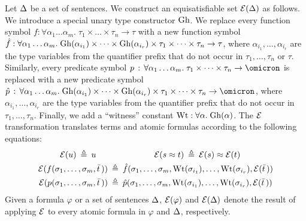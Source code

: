 
Let $\mathrm{\Delta}$ be a set of sentences.
We construct an equisatisfiable set $\mathcal{E}(\mathrm{\Delta})$ as follows.
%
We introduce a special unary type constructor $\mathrm{Gh}$.
We replace every function symbol $f : \forall \alpha_1\dots\alpha_m .\; \tau_1 \times \dots \times \tau_n \to \tau$
with a new function symbol $\hat{f} : \forall \alpha_1\dots\alpha_m .\;
\mathrm{Gh}(\alpha_{i_1}) \times \dots \times \mathrm{Gh}(\alpha_{i_r}) \times
\tau_1 \times \dots \times \tau_n \to \tau$,
where $\alpha_{i_1},\dots,\alpha_{i_r}$ are the type
variables from the quantifier prefix that do not occur in
$\tau_1,\dots,\tau_n$ or $\tau$.
Similarly, every predicate symbol $p \,\ty\,
\forall \alpha_1\dots\alpha_m .\;\allowbreak \tau_1 \times \dots \times \tau_n \to \omicron$
is replaced with a new predicate symbol $\hat{p} \,\ty\,
\forall \alpha_1\dots\alpha_m .\;\allowbreak
\ghost(\alpha_{i_1}) \times \dots \times \ghost(\alpha_{i_r}) \times
\tau_1 \times \dots \times \tau_n \to \omicron$,
where $\alpha_{i_1},\dots,\alpha_{i_r}$ are the type
variables from the quantifier prefix that do not occur in
$\tau_1,\dots,\tau_n$.
Finally, we add a ``witness'' constant $\mathrm{Wt} : \forall \alpha.\;\mathrm{Gh}(\alpha)$.
The $\mathcal{E}$ transformation translates terms and atomic
formulas according to the following equations:
\begin{align*}
\ELI(u) \eqdef u
\kern1.4em & \kern5.55em %
\ELI(s \eq t) \eqdef \ELI(s) \eq \ELI(t) \\
\ELI(f(\sigma_1,\dots,\sigma_m,\bar t\,)) &\eqdef
\hat{f}(\sigma_1,\dots,\sigma_m,\wit(\sigma_{i_1}),\dots,\wit(\sigma_{i_r}),
\ELI(\bar t\,)) \\
\ELI(p(\sigma_1,\dots,\sigma_m,\bar t\,)) &\eqdef
\hat{p}(\sigma_1,\dots,\sigma_m,\wit(\sigma_{i_1}),\dots,\wit(\sigma_{i_r}),
\ELI(\bar t\,))
\end{align*}
Given a formula $\varphi$ or a set of sentences $\mathrm{\Delta}$,
$\mathcal{E}(\varphi)$ and $\mathcal{E}(\mathrm{\Delta})$ denote the result of
applying $\mathcal{E}$ to every atomic formula in $\varphi$ and
$\mathrm{\Delta}$, respectively.

